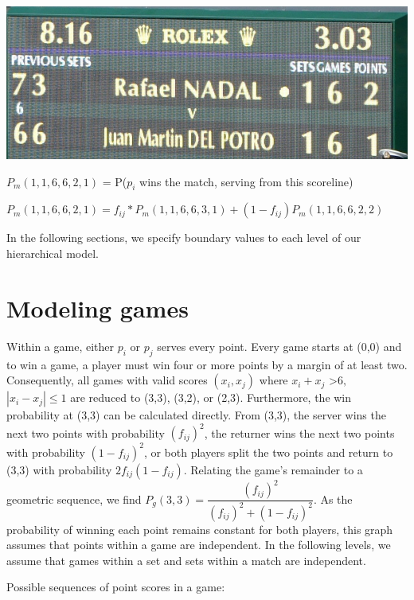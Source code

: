 \documentclass[chapterprefix=false]{report}
\begin{document}
\begin{center}

\includegraphics[scale=.3]{scoreboard}

$P_m(1,1,6,6,2,1)$ = P($p_i$ wins the match, serving from this scoreline)

$P_m(1,1,6,6,2,1) = f_{ij}*P_m(1,1,6,6,3,1) + (1-f_{ij}) P_m(1,1,6,6,2,2)$


\end{center}
In the following sections, we specify boundary values to each level of our hierarchical model. 



\section{Modeling games}

Within a game, either $p_i$ or $p_j$ serves every point. Every game starts at (0,0) and to win a game, a player must win four or more points by a margin of at least two. Consequently, all games with valid scores $(x_i,x_j)$ where $x_i+x_j$ \textgreater $6,$ $|x_i-x_j| \leq 1$ are reduced to (3,3), (3,2), or (2,3). Furthermore, the win probability at (3,3) can be calculated directly. From (3,3), the server wins the next two points with probability $(f_{ij})^2$, the returner wins the next two points with probability $(1-f_{ij})^2$, or both players split the two points and return to (3,3) with probability $2f_{ij}(1-f_{ij})$. Relating the game's remainder to a geometric sequence, we find $P_g(3,3) = \dfrac{(f_{ij})^2}{(f_{ij})^2+(1-f_{ij})^2}$. As the probability of winning each point remains constant for both players, this graph assumes that points within a game are independent. In the following levels, we assume that games within a set and sets within a match are independent.

Possible sequences of point scores in a game:
\end{document}
